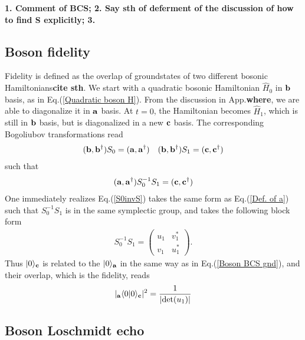 {\bf\color{red} 1. Comment of BCS; 2. Say sth of deferment of the discussion of how to find S explicitly; 3. }

\subsection{Boson fidelity} 
\label{Boson fidelity}

Fidelity is defined as the overlap of groundstates of two different bosonic Hamiltonians{\bf\color{red}cite sth}. We start with a quadratic bosonic Hamiltonian $\hat{H}_0$ in ${\bf b}$ basis, as in Eq.(\ref{Quadratic boson H}). From the discussion in App.{\bf\color{red}where}, we are able to diagonalize it in ${\bf a}$ basis. At $t=0$, the Hamiltonian becomes $\hat{H}_1$, which is still in ${\bf b}$ basis, but is diagonalized in a new ${\bf c}$ basis. The corresponding Bogoliubov transformations read
\begin{eqnarray}\begin{aligned}
\label{Two BdG}
({\bf b} , {\bf b}^\dagger)S_0=({\bf a} , {\bf a}^\dagger)\quad
({\bf b} , {\bf b}^\dagger)S_1=({\bf c} , {\bf c}^\dagger)
\end{aligned}\end{eqnarray}
such that
\begin{eqnarray}\begin{aligned}
\label{S0invS}
({\bf a} , {\bf a}^\dagger)S_0^{-1}S_1=({\bf c} , {\bf c}^\dagger)
\end{aligned}\end{eqnarray}
One immediately realizes Eq.(\ref{S0invS}) takes the same form as Eq.(\ref{Def. of a}) such that $S_0^{-1}S_1$ is in the same symplectic group, and takes the following block form
\begin{eqnarray}
S_0^{-1}S_1=\left(\begin{array}{ccc}
u_1 & v_1^*\\
v_1 & u_1^*
\end{array}\right).
\end{eqnarray}
Thus $|0\rangle_{\bf c}$ is related to the $|0\rangle_{{\bf a}}$ in the same way as in Eq.(\ref{Boson BCS gnd}), and their overlap, which is the fidelity, reads
\begin{eqnarray}\begin{aligned}
|_{\bf a}\langle0|0\rangle_{\bf c}|^2=\frac{1}{|\text{det}(u_1)|}
\end{aligned}\end{eqnarray}

\subsection{Boson Loschmidt echo}


